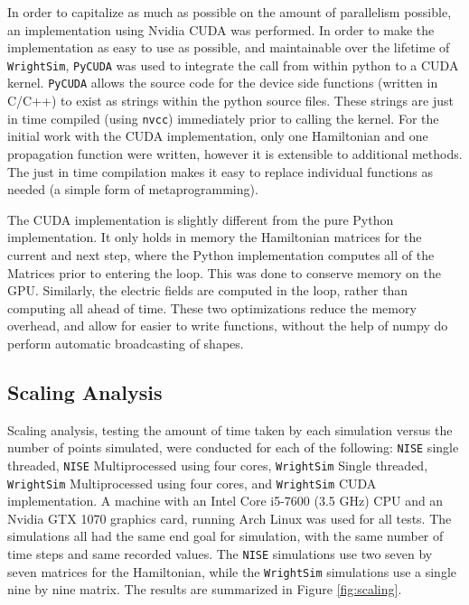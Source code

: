 \documentclass[fontsize=11pt]{scrartcl}
\numberwithin{equation}{section}		%
\numberwithin{figure}{section}			%
\numberwithin{table}{section}				%
\begin{document}
In order to capitalize as much as possible on the amount of parallelism possible, an implementation using Nvidia CUDA \cite{Nickolls_2008} was performed. In order to make the implementation as easy to use as possible, and maintainable over the lifetime of \texttt{WrightSim}, \texttt{PyCUDA} was used to integrate the call from within python to a CUDA kernel.
\texttt{PyCUDA} allows the source code for the device side functions (written in C/C++) to exist as strings within the python source files. These strings are just in time compiled (using \texttt{nvcc}) immediately prior to calling the kernel.
For the initial work with the CUDA implementation, only one Hamiltonian and one propagation function were written, however it is extensible to additional methods.
The just in time compilation makes it easy to replace individual functions as needed (a simple form of metaprogramming).

The CUDA implementation is slightly different from the pure Python implementation.
It only holds in memory the Hamiltonian matrices for the current and next step, where the Python implementation computes all of the Matrices prior to entering the loop.
This was done to conserve memory on the GPU.
Similarly, the electric fields are computed in the loop, rather than computing all ahead of time.
These two optimizations reduce the memory overhead, and allow for easier to write functions, without the help of numpy do perform automatic broadcasting of shapes.

\subsection{Scaling Analysis}

Scaling analysis, testing the amount of time taken by each simulation versus the number of points simulated, were conducted for each of the following: \texttt{NISE} single threaded, \texttt{NISE} Multiprocessed using four cores, \texttt{WrightSim} Single threaded, \texttt{WrightSim} Multiprocessed using four cores, and \texttt{WrightSim} CUDA implementation.
A machine with an Intel Core i5-7600 (3.5 GHz)  CPU and an Nvidia GTX 1070 graphics card, running Arch Linux was used for all tests.
The simulations all had the same end goal for simulation, with the same number of time steps and same recorded values.
The \texttt{NISE} simulations use two seven by seven matrices for the Hamiltonian, while the \texttt{WrightSim} simulations use a single nine by nine matrix.
The results are summarized in Figure \ref{fig:scaling}.
\end{document}
